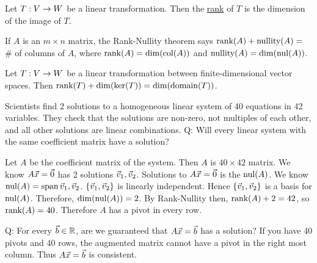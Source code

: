\documentclass[10pt,a4paper]{article}
\begin{document}
\begin{definition}
	Let $T:V\rightarrow W$ be a linear transformation. Then the \underline{rank} of $T$ is the dimension of the image of $T$.
\end{definition}
\begin{recall}
	If $A$ is an $m\times n$ matrix, the Rank-Nullity theorem says $\text{rank}(A)+\text{nullity}(A) = $ \# of columns of $A$, where $\text{rank}(A) = \dim(\text{col}(A))$ and $\text{nullity}(A) = \dim(\text{nul}(A))$.
\end{recall}
\begin{theorem}
	Let $T:V\rightarrow W$ be a linear transformation between finite-dimensional vector spaces. Then $\text{rank}(T)+\dim(\ker(T)) = \dim(\text{domain}(T))$.
\end{theorem}
\begin{example}
	Scientists find 2 solutions to a homogeneous linear system of 40 equations in 42 variables. They check that the solutions are non-zero, not multiples of each other, and all other solutions are linear combinations.
	Q: Will every linear system with the same coefficient matrix have a solution?
	
	Let $A$ be the coefficient matrix of the system. Then $A$ is $40\times42$ matrix. We know $A\vec{x} = \vec{0}$ has 2 solutions $\vec{v}_1,\vec{v}_2$. Solutions to $A\vec{x} = \vec{0}$ is the $\text{nul}(A)$. We know $\text{nul}(A) = \text{span}\,\vec{v}_1,\vec{v}_2$. $\{\vec{v}_1,\vec{v}_2\}$ is linearly independent. Hence $\{\vec{v}_1,\vec{v}_2\}$ is a basis for $\text{nul}(A)$. Therefore, $\dim(\text{nul}(A)) = 2$. By Rank-Nullity then, $\text{rank}(A) + 2 = 42$, so $\text{rank}(A) = 40$. Therefore $A$ has a pivot in every row.
	
	Q: For every $\vec{b}\in\mathbb{R}$, are we guaranteed that $A\vec{x} = \vec{b}$ has a solution? If you have 40 pivots and 40 rows, the augmented matrix cannot have a pivot in the right most column. Thus $A\vec{x} = \vec{b}$ is consistent.
\end{example}
\end{document}
